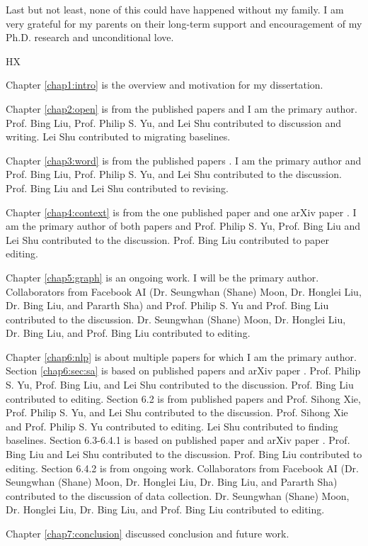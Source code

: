 \documentclass{uicthesi}
\begin{document}
{Last but not least, none of this could have happened without my family. I am very grateful for my parents on their long-term support and encouragement of my Ph.D. research and unconditional love.\\
\begin{flushright}HX\end{flushright}}


\contributionofauthors
{Chapter \ref{chap1:intro} is the overview and motivation for my dissertation.

Chapter \ref{chap2:open} is from the published papers \cite{xu2019open,xu2018open} and I am the primary author. Prof. Bing Liu, Prof. Philip S. Yu, and Lei Shu contributed to discussion and writing. Lei Shu contributed to migrating baselines.

Chapter \ref{chap3:word} is from the published papers \cite{xu2018lifelong,xu2018double}. I am the primary author and Prof. Bing Liu, Prof. Philip S. Yu, and Lei Shu contributed to the discussion. Prof. Bing Liu and Lei Shu contributed to revising.

Chapter \ref{chap4:context} is from the one published paper \cite{xu2019bert} and one arXiv paper \cite{xu2019review}. I am the primary author of both papers and Prof. Philip S. Yu, Prof. Bing Liu and Lei Shu contributed to the discussion. Prof. Bing Liu contributed to paper editing.

Chapter \ref{chap5:graph} is an ongoing work. I will be the primary author. Collaborators from Facebook AI (Dr. Seungwhan (Shane) Moon, Dr. Honglei Liu, Dr. Bing Liu, and Pararth Sha) and Prof. Philip S. Yu and Prof. Bing Liu contributed to the discussion. 
Dr. Seungwhan (Shane) Moon, Dr. Honglei Liu, Dr. Bing Liu, and Prof. Bing Liu contributed to editing. 

Chapter \ref{chap6:nlp} is about multiple papers for which I am the primary author.
Section \ref{chap6:sec:sa} is based on published papers \cite{xu2018double,xu2019bert} and arXiv paper \cite{xu2019afailure}. Prof.  Philip S. Yu, Prof. Bing Liu, and Lei Shu contributed to the discussion. 
Prof. Bing Liu contributed to editing.
Section 6.2 is from published papers \cite{xu2016CER,xu2017supervised} and Prof. Sihong Xie, Prof. Philip S. Yu, and Lei Shu contributed to the discussion. Prof. Sihong Xie and Prof. Philip S. Yu contributed to editing. Lei Shu contributed to finding baselines.
Section 6.3-6.4.1 is based on published paper \cite{xu2019bert} and arXiv paper \cite{xu2019review}. Prof. Bing Liu and Lei Shu contributed to the discussion. Prof. Bing Liu contributed to editing.
Section 6.4.2 is from ongoing work. Collaborators from Facebook AI (Dr. Seungwhan (Shane) Moon, Dr. Honglei Liu, Dr. Bing Liu, and Pararth Sha) contributed to the discussion of data collection. Dr. Seungwhan (Shane) Moon, Dr. Honglei Liu, Dr. Bing Liu, and Prof. Bing Liu contributed to editing. 

Chapter \ref{chap7:conclusion} discussed conclusion and future work.
}
\end{document}
